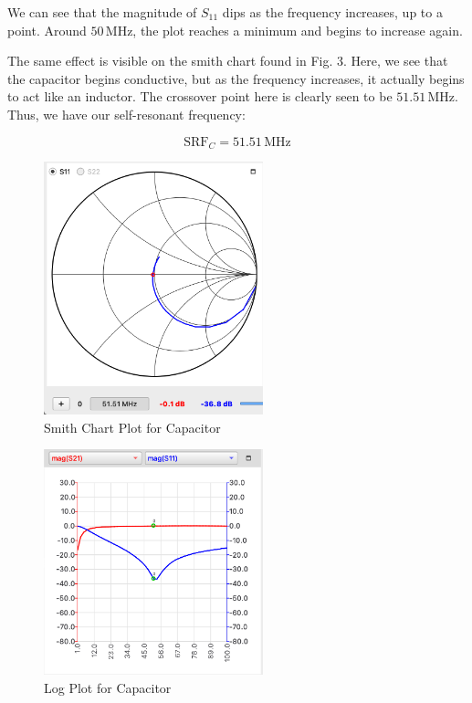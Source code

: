 \documentclass[lettersize,journal]{IEEEtran}
\begin{document}
We can see that the magnitude of $S_{11}$ dips as the frequency increases, up to a point. Around $50 \, \text{MHz}$, the plot reaches a minimum and begins to increase again.

The same effect is visible on the smith chart found in Fig. 3. Here, we see that the capacitor begins conductive, but as the frequency increases, it actually begins to act like an inductor. The crossover point here is clearly seen to be $51.51 \, \text{MHz}$. Thus, we have our self-resonant frequency:

\begin{equation}
\text{SRF}_C = 51.51 \, \text{MHz}
\end{equation}

\begin{figure}[!t]
\centering
\includegraphics[width=2.5in]{capacitor-smith}
\caption{Smith Chart Plot for Capacitor}
\label{fig_1}
\end{figure}

\begin{figure}[!t]
\centering
\includegraphics[width=2.5in]{capacitor-log}
\caption{Log Plot for Capacitor}
\label{fig_1}
\end{figure}
\end{document}
